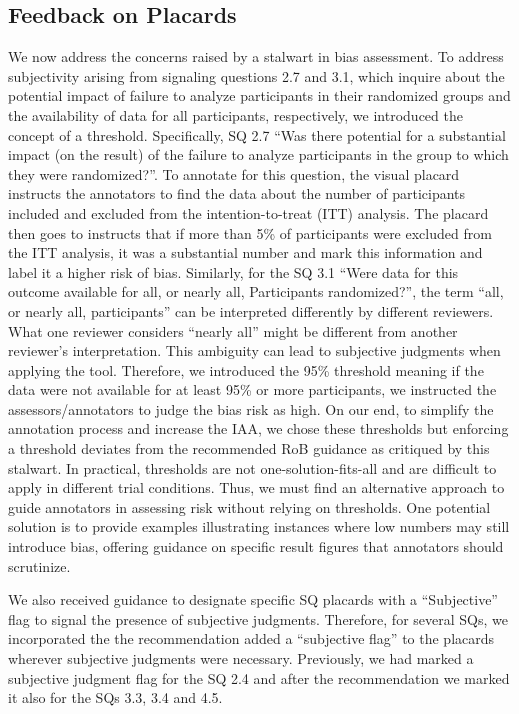 \documentclass[sn-mathphys,Numbered]{sn-jnl}%
\theoremstyle{thmstyleone}%
\theoremstyle{thmstyletwo}%
\theoremstyle{thmstylethree}%
\begin{document}
\subsection{Feedback on Placards}
\label{disc:improv}
%
We now address the concerns raised by a stalwart in bias assessment.
To address subjectivity arising from signaling questions 2.7 and 3.1, which inquire about the potential impact of failure to analyze participants in their randomized groups and the availability of data for all participants, respectively, we introduced the concept of a threshold.
Specifically, SQ 2.7 ``Was there potential for a substantial impact (on the result) of the failure to analyze participants in the group to which they were randomized?''.
To annotate for this question, the visual placard instructs the annotators to find the data about the number of participants included and excluded from the intention-to-treat (ITT) analysis.
The placard then goes to instructs that if more than 5\% of participants were excluded from the ITT analysis, it was a substantial number and mark this information and label it a higher risk of bias.
Similarly, for the SQ 3.1 ``Were data for this outcome available for all, or nearly all, Participants randomized?'', the term ``all, or nearly all, participants'' can be interpreted differently by different reviewers.
What one reviewer considers ``nearly all'' might be different from another reviewer's interpretation.
This ambiguity can lead to subjective judgments when applying the tool.
Therefore, we introduced the 95\% threshold meaning if the data were not available for at least 95\% or more participants, we instructed the assessors/annotators to judge the bias risk as high.
On our end, to simplify the annotation process and increase the IAA, we chose these thresholds but enforcing a threshold deviates from the recommended RoB guidance as critiqued by this stalwart.
In practical, thresholds are not one-solution-fits-all and are difficult to apply in different trial conditions.
Thus, we must find an alternative approach to guide annotators in assessing risk without relying on thresholds.
One potential solution is to provide examples illustrating instances where low numbers may still introduce bias, offering guidance on specific result figures that annotators should scrutinize.



We also received guidance to designate specific SQ placards with a ``Subjective'' flag to signal the presence of subjective judgments.
Therefore, for several SQs, we incorporated the the recommendation added a ``subjective flag'' to the placards wherever subjective judgments were necessary.
Previously, we had marked a subjective judgment flag for the SQ 2.4 and after the recommendation we marked it also for the SQs 3.3, 3.4 and 4.5.
\end{document}
